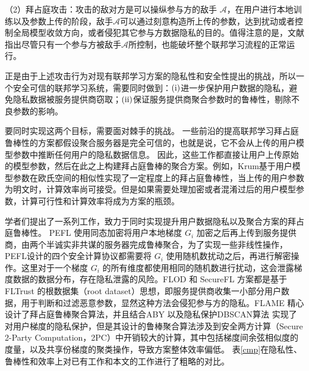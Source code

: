 （2）拜占庭攻击：攻击的敌对方是可以操纵参与方的敌手 $\mathcal{A}$，在用户进行本地训练以及参数上传的阶段，敌手$\mathcal{A}$可以通过刻意构造所上传的参数，达到扰动或者控制全局模型收敛方向，或者侵犯其它参与方数据隐私的目的\cite{kairouz2019advances}。值得注意的是，文献\cite{blanchard2017machine}指出尽管只有一个参与方被敌手$\mathcal{A}$所控制，也能破坏整个联邦学习流程的正常运行。

正是由于上述攻击行为对现有联邦学习方案的隐私性和安全性提出的挑战，所以一个安全可信的联邦学习系统，需要同时做到：$(\rm \romannumeral1)$进一步保护用户数据的隐私，避免隐私数据被服务提供商窃取；$(\rm \romannumeral2)$保证服务提供商聚合参数时的鲁棒性，剔除不良参数的影响。

要同时实现这两个目标，需要面对棘手的挑战。
一些前沿的提高联邦学习拜占庭鲁棒性的方案\cite{blanchard2017machine, guerraoui2018hidden, yin2018byzantine}都假设聚合服务器是完全可信的，也就是说，它不会从上传的用户模型参数中推断任何用户的隐私数据信息。
因此，这些工作都直接让用户上传原始的模型参数，然后在此之上构建拜占庭鲁棒的聚合方案。例如，Krum\cite{blanchard2017machine}基于用户模型参数在欧氏空间的相似性实现了一定程度上的拜占庭鲁棒性，当上传的用户参数为明文时，计算效率尚可接受。但是如果需要处理加密或者混淆过后的用户模型参数，计算可行性和计算效率将成为方案的瓶颈。

学者们提出了一系列工作\cite{liu2021privacy, dong2021flod, nguyen2022flame, hao2021efficient, so2020byzantine}，致力于同时实现提升用户数据隐私以及聚合方案的拜占庭鲁棒性。
PEFL\cite{liu2021privacy} 使用同态加密将用户本地梯度 $G_i$ 加密之后再上传到服务提供商，由两个半诚实非共谋的服务器完成鲁棒聚合，为了实现一些非线性操作，PEFL设计的四个安全计算协议都需要将 $G_i$ 使用随机数扰动之后，再进行解密操作。这里对于一个梯度 $G_i$ 的所有维度都使用相同的随机数进行扰动，这会泄露梯度数据的数据分布，存在隐私泄露的风险。FLOD \cite{dong2021flod} 和 SecureFL \cite{hao2021efficient} 方案都是基于FLTrust \cite{DBLP:conf/ndss/CaoF0G21} 的根数据集（root dataset）思想，即服务提供商收集一小部分用户数据，用于判断和过滤恶意参数，显然这种方法会侵犯参与方的隐私。FLAME \cite{nguyen2022flame} 精心设计了拜占庭鲁棒聚合算法，并且结合ABY\cite{demmler2015aby} 以及隐私保护DBSCAN算法 \cite{bozdemir2021privacy} 实现了对用户梯度的隐私保护，但是其设计的鲁棒聚合算法涉及到安全两方计算（Secure 2-Party Computation，2PC）中开销较大的计算，其中包括梯度间余弦相似度的度量，以及共享份梯度的聚类操作，导致方案整体效率偏低。
表\ref{cmp}在隐私性、鲁棒性和效率上对已有工作和本文的工作进行了粗略的对比。

